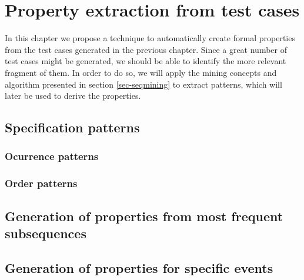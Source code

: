 \chapter{Property extraction from test cases}
\label{cap:propextract}

In this chapter we propose a technique to automatically create formal properties from the test cases generated in the previous chapter. Since a great number of test cases might be generated, we should be able to identify the more relevant fragment of them. In order to do so, we will apply the mining concepts and algorithm presented in section \ref{sec-seqmining} to extract patterns, which will later be used to derive the properties.



%


%

\section{Specification patterns}

\subsection{Ocurrence patterns}

\subsection{Order patterns}


\section{Generation of properties from most frequent subsequences}

\section{Generation of properties for specific events}
